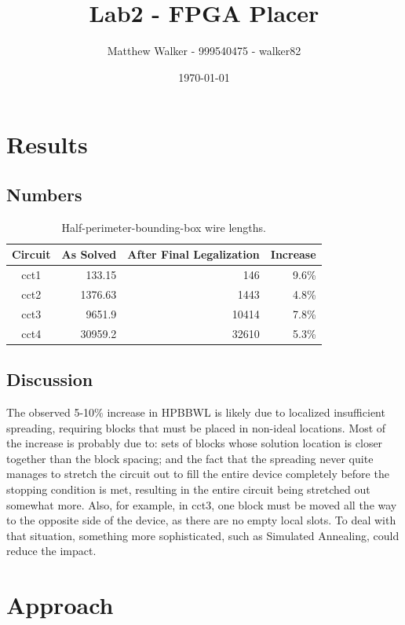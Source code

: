 \documentclass[11pt]{article}
\title{Lab2 - FPGA Placer}
\author{Matthew Walker - 999540475 - walker82}
\date{\today}
\begin{document}
\maketitle

\section{Results}
\subsection{Numbers}
\begin{table}[ht]
\centering\begin{tabular}{ c *3r}
\hline\hline
Circuit & As Solved & After Final Legalization & Increase \\
\hline
cct1 & 133.15  & 146   & 9.6\% \\
cct2 & 1376.63 & 1443  & 4.8\% \\
cct3 & 9651.9  & 10414 & 7.8\% \\
cct4 & 30959.2 & 32610 & 5.3\% \\
\hline\hline
\end{tabular}
\caption{Half-perimeter-bounding-box wire lengths. \label{tab:hpbbwl}}
\end{table}

\subsection{Discussion}
The observed 5-10\% increase in HPBBWL is likely due to localized insufficient spreading, requiring blocks that must be placed in non-ideal locations. Most of the increase is probably due to: sets of blocks whose solution location is closer together than the block spacing; and the fact that the spreading never quite manages to stretch the circuit out to fill the entire device completely before the stopping condition is met, resulting in the entire circuit being stretched out somewhat more. Also, for example, in cct3, one block must be moved all the way to the opposite side of the device, as there are no empty local slots. To deal with that situation, something more sophisticated, such as Simulated Annealing, could reduce the impact.

\section{Approach}
\end{document}
